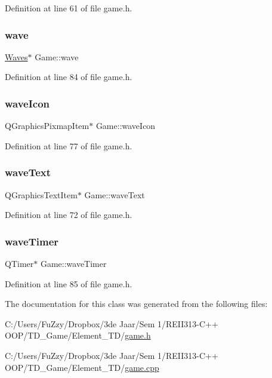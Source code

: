 Definition at line 61 of file game.\+h.

\mbox{\label{class_game_af9a4b49ad573785e961b29758c84fdd0}} 
\subsubsection{\texorpdfstring{wave}{wave}}
{\footnotesize\ttfamily \hyperlink{class_waves}{Waves}$\ast$ Game\+::wave}



Definition at line 84 of file game.\+h.

\mbox{\label{class_game_ade75481ee579a63670f6d7358919634a}} 
\subsubsection{\texorpdfstring{wave\+Icon}{waveIcon}}
{\footnotesize\ttfamily Q\+Graphics\+Pixmap\+Item$\ast$ Game\+::wave\+Icon}



Definition at line 77 of file game.\+h.

\mbox{\label{class_game_ac33d078835536f2dc1af85ddbabd3a20}} 
\subsubsection{\texorpdfstring{wave\+Text}{waveText}}
{\footnotesize\ttfamily Q\+Graphics\+Text\+Item$\ast$ Game\+::wave\+Text}



Definition at line 72 of file game.\+h.

\mbox{\label{class_game_a06a7795cf068aa5cc3b1debbea3f82ef}} 
\subsubsection{\texorpdfstring{wave\+Timer}{waveTimer}}
{\footnotesize\ttfamily Q\+Timer$\ast$ Game\+::wave\+Timer}



Definition at line 85 of file game.\+h.



The documentation for this class was generated from the following files\+:\begin{DoxyCompactItemize}
\item 
C\+:/\+Users/\+Fu\+Zzy/\+Dropbox/3de Jaar/\+Sem 1/\+R\+E\+I\+I313-\/\+C++ O\+O\+P/\+T\+D\+\_\+\+Game/\+Element\+\_\+\+T\+D/\hyperlink{game_8h}{game.\+h}\item 
C\+:/\+Users/\+Fu\+Zzy/\+Dropbox/3de Jaar/\+Sem 1/\+R\+E\+I\+I313-\/\+C++ O\+O\+P/\+T\+D\+\_\+\+Game/\+Element\+\_\+\+T\+D/\hyperlink{game_8cpp}{game.\+cpp}\end{DoxyCompactItemize}
